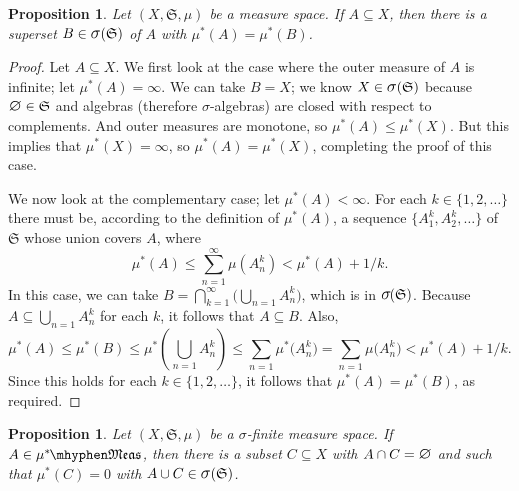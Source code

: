 \documentclass[
twoside=true,
paper=letter,
fontsize=9pt,
pagesize=auto,
leqno,
openany,
headsepline,
overfullrule,
]{scrbook}
\theoremstyle{plain}
\theoremstyle{plain}
\newtheorem{prop}[thm]{Proposition}
\theoremstyle{definition}
\theoremstyle{bfnoteitalic}
\theoremstyle{bfnoteroman}
\newcommand{\sigalg}[1]{\mathfrak{#1}}
\newcommand{\sagb}{\mathop{\hbox{\large{$\sigma$}}}\nolimits}
\newcommand{\textsigma}{\hbox{\large{$\sigma$}}\kern-1pt}
\newcommand{\mtset}{\hbox{\large{$\varnothing$}}}
\newcommand{\meets}{\cap}
\newcommand{\semiring}{\sigalg{S}}
\newcommand{\measurable}[1]{{#1}\mhyphen\mathfrak{Meas}}
\newcommand{\kernast}{\ast\kern-1pt}
\newcommand{\measurespace}{X}
\newcommand{\measure}{\mu}
\begin{document}
\begin{prop}\label{approximation_sigma_algebra}
Let $(\measurespace, \semiring, \measure)$ be a measure space. If 
$A\subseteq\measurespace$, then there is a superset 
$B\in \sagb(\semiring)$ of $A$ with $\measure^*(A) = \measure^*(B)$.
\end{prop}


\begin{proof}
Let $A\subseteq\measurespace$. 
We first look at the case where the outer measure of $A$  is infinite; let $\measure^*(A)=\infty$. We can take $B=\measurespace$; we know $\measurespace\in \sagb(\semiring)$ because $\mtset \in \semiring$ and algebras 
(therefore \textsigma-algebras) are closed with respect to complements.  And outer measures are monotone, so $\measure^*(A) \leq \measure^*(\measurespace)$. But this implies that $\measure^*(\measurespace)=\infty$, so $\measure^*(A) = \measure^*(\measurespace)$, completing the proof of this case.

We now look at the complementary case; let $\measure^*(A) < \infty$. For each $k\in\{1,2,\ldots\}$ there must be, according to the definition of $\measure^*(A)$, a sequence $\{A^k_1, A^k_2, \ldots \}$ of $\semiring$ whose union covers $A$, where
\[
\measure^*(A)\leq \sum_{n=1}^\infty\measure(A^k_n) < \measure^*(A) + 1/k.
\] 
In this case, we can take 
$B= \bigcap_{k=1}^\infty \bigl( \bigcup_{n = 1} A^k_n \bigr)$, which is in $\textsigma(\semiring)$. Because $A\subseteq \bigcup_{n = 1} A^k_n$ for each $k$, it follows that $A\subseteq B$.
Also, 
\[
\measure^*(A) \leq \measure^*(B) 
\leq \measure^*\left(\bigcup_{n = 1} A^k_n \right) 
\leq \sum_{n = 1} \measure^* \bigl( A^k_n \bigr)
= \sum_{n = 1} \measure \bigl( A^k_n \bigr)
< \measure^*(A) + 1/k.
\]
Since this holds for each $k\in\{1,2,\ldots\}$, it follows that $\measure^*(A) = \measure^*(B)$, as required.
\end{proof}





\begin{prop}\label{approximation_sigma_finite}
Let $(\measurespace, \semiring, \measure)$ be a \textsigma-finite measure space. If 
$A\in\measurable{\measure^\kernast}$, then there is a subset $C\subseteq\measurespace$ with $A\meets C =\mtset$ and  such that $\measure^*(C) = 0$ with $A\cup C\in \sagb(\semiring)$. 
\end{prop}
\end{document}
